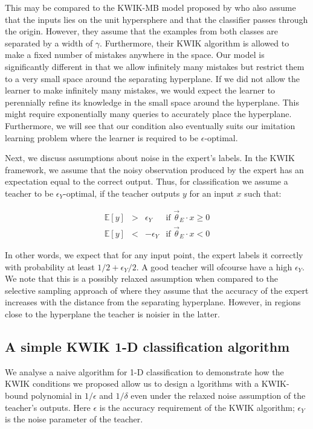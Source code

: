 This may be compared to the KWIK-MB model proposed by \citet{DBLP:conf/nips/SayediZB10} who also assume that the inputs lies on the unit hypersphere and that the classifier passes through the origin. However, they assume that the examples from both classes are separated by a width of $\gamma$. Furthermore,  their KWIK algorithm  is allowed to make a fixed number of mistakes anywhere in the space. Our model is significantly different in that we allow infinitely many mistakes but restrict them to a very small space around the separating hyperplane. If we did not allow the learner to make infinitely many mistakes, we would expect the learner to perennially refine its knowledge in the small space around the hyperplane. This might require exponentially many queries to accurately place the hyperplane. Furthermore, we will see that our condition also eventually suits our imitation learning problem where the learner is required to be $\epsilon$-optimal.   


Next, we discuss assumptions about noise in the expert's labels. 
In the KWIK framework, we assume that the noisy observation produced by the expert has an expectation equal to the correct output. Thus, for classification we assume a teacher to be $\epsilon_Y$-optimal, if the teacher outputs  $y$ for an input $x$ such that:

\[
\begin{array}{rccl}
 \mathbb{E}[y] & > &\epsilon_Y & \text{if } \vec{\theta}_E \cdot x \geq 0 \\
 \mathbb{E}[y] &< &-\epsilon_Y & \text{if } \vec{\theta}_E \cdot x < 0
\end{array}
\]

In other words, we expect that for any input point, the expert labels it correctly with probability at least $1/2 + \epsilon_Y/2$.  A good teacher will ofcourse have a high $\epsilon_Y$. We note that this is a possibly relaxed assumption when compared to the selective sampling approach of \citet{Cesa-Bianchi:2009:RBC:1553374.1553390} where they assume that the accuracy of the expert increases with the distance from the separating hyperplane. However, in regions close to the hyperplane the teacher is noisier in the latter. 

\subsection{A simple KWIK 1-D classification algorithm}
\label{sec:simple}
We analyse a naive algorithm for 1-D classification to demonstrate how the KWIK conditions we proposed  allow us to design a	lgorithms with a KWIK-bound polynomial in $1/\epsilon$ and $1/\delta$ even under the relaxed noise assumption of the teacher's outputs. Here $\epsilon$ is the accuracy requirement of the KWIK algorithm; $\epsilon_Y$ is the noise parameter of the teacher. \\

